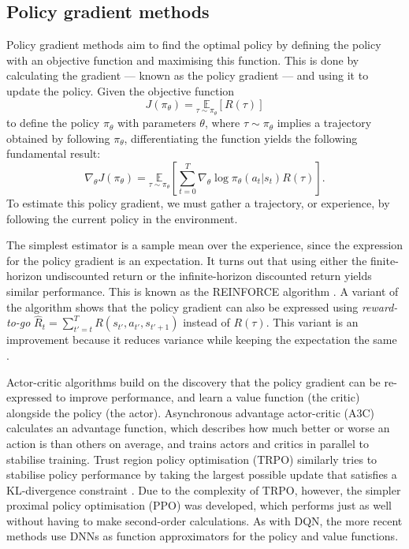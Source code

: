 \documentclass[12pt,a4paper]{article}
\begin{document}
\subsection{Policy gradient methods}
Policy gradient methods aim to find the optimal policy by defining the policy with an objective function and maximising this function. This is done by calculating the gradient --- known as the policy gradient --- and using it to update the policy. Given the objective function $$J(\pi_{\theta}) = \underset{\tau \sim \pi_{\theta}}{\mathbb{E}}\left[R(\tau)\right]$$ to define the policy $\pi_\theta$ with parameters $\theta$, where $\tau \sim \pi_{\theta}$ implies a trajectory obtained by following $\pi_\theta$, differentiating the function yields the following fundamental result: $$\nabla_{\theta} J(\pi_{\theta}) = \underset{\tau \sim \pi_{\theta}}{\mathbb{E}} \left[{\sum_{t=0}^{T} \nabla_{\theta} \log \pi_{\theta}(a_t |s_t) R(\tau)}\right].$$ To estimate this policy gradient, we must gather a trajectory, or experience, by following the current policy in the environment.

The simplest estimator is a sample mean over the experience, since the expression for the policy gradient is an expectation. It turns out that using either the finite-horizon undiscounted return or the infinite-horizon discounted return yields similar performance. This is known as the REINFORCE algorithm \cite{Williams1992}. A variant of the algorithm shows that the policy gradient can also be expressed using \emph{reward-to-go} $\hat{R}_t = \sum_{t'=t}^T R(s_{t'}, a_{t'}, s_{t'+1})$ instead of $R(\tau)$. This variant is an improvement because it reduces variance while keeping the expectation the same \cite{SpinningUp2018}. 

Actor-critic algorithms \cite{Konda2000} build on the discovery that the policy gradient can be re-expressed to improve performance, and learn a value function (the critic) alongside the policy (the actor). Asynchronous advantage actor-critic (A3C) \cite{mnih2016asynchronous} calculates an advantage function, which describes how much better or worse an action is than others on average, and trains actors and critics in parallel to stabilise training. Trust region policy optimisation (TRPO) \cite{DBLP:journals/corr/SchulmanLMJA15} similarly tries to stabilise policy performance by taking the largest possible update that satisfies a KL-divergence constraint \cite{kullback1951information}. Due to the complexity of TRPO, however, the simpler proximal policy optimisation (PPO) \cite{DBLP:journals/corr/SchulmanWDRK17} was developed, which performs just as well without having to make second-order calculations. As with DQN, the more recent methods use DNNs as function approximators for the policy and value functions.
\end{document}
